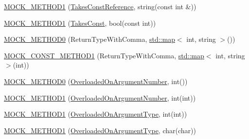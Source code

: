 \begin{DoxyCompactItemize}
\item 
\hyperlink{classtesting_1_1gmock__generated__function__mockers__test_1_1MockFoo_a605c84c3375d02769b0288d7637b552f}{M\+O\+C\+K\+\_\+\+M\+E\+T\+H\+O\+D1} (\hyperlink{classtesting_1_1gmock__generated__function__mockers__test_1_1FooInterface_a3db03c9698ecddfc62f2a1ed2f3c32c2}{Takes\+Const\+Reference}, string(const int \&))
\item 
\hyperlink{classtesting_1_1gmock__generated__function__mockers__test_1_1MockFoo_a7b548776b156454bcddecaca6294c52f}{M\+O\+C\+K\+\_\+\+M\+E\+T\+H\+O\+D1} (\hyperlink{classtesting_1_1gmock__generated__function__mockers__test_1_1FooInterface_a8c53e87edf0b9da878e5259f02b7f5dc}{Takes\+Const}, bool(const int))
\item 
\hyperlink{classtesting_1_1gmock__generated__function__mockers__test_1_1MockFoo_a5fb8c71ba44b97fbc8945905a9835215}{M\+O\+C\+K\+\_\+\+M\+E\+T\+H\+O\+D0} (Return\+Type\+With\+Comma, \hyperlink{app_2main_8cpp_a8f2b5a2f358cff079fbf01614064fbe5}{std\+::map}$<$ int, string $>$())
\item 
\hyperlink{classtesting_1_1gmock__generated__function__mockers__test_1_1MockFoo_a777b7b57ac125e2fe868e6cda46833fc}{M\+O\+C\+K\+\_\+\+C\+O\+N\+S\+T\+\_\+\+M\+E\+T\+H\+O\+D1} (Return\+Type\+With\+Comma, \hyperlink{app_2main_8cpp_a8f2b5a2f358cff079fbf01614064fbe5}{std\+::map}$<$ int, string $>$(int))
\item 
\hyperlink{classtesting_1_1gmock__generated__function__mockers__test_1_1MockFoo_a1666c565d1b48b351a1a453f6f87ff22}{M\+O\+C\+K\+\_\+\+M\+E\+T\+H\+O\+D0} (\hyperlink{classtesting_1_1gmock__generated__function__mockers__test_1_1FooInterface_ae9e86ac64fa9acedfb1fa747174c7f43}{Overloaded\+On\+Argument\+Number}, int())
\item 
\hyperlink{classtesting_1_1gmock__generated__function__mockers__test_1_1MockFoo_a45014dba5c27e9d59af3a94e0d324096}{M\+O\+C\+K\+\_\+\+M\+E\+T\+H\+O\+D1} (\hyperlink{classtesting_1_1gmock__generated__function__mockers__test_1_1FooInterface_ae9e86ac64fa9acedfb1fa747174c7f43}{Overloaded\+On\+Argument\+Number}, int(int))
\item 
\hyperlink{classtesting_1_1gmock__generated__function__mockers__test_1_1MockFoo_ad900c5945fc52a0a95ca1480207c7add}{M\+O\+C\+K\+\_\+\+M\+E\+T\+H\+O\+D1} (\hyperlink{classtesting_1_1gmock__generated__function__mockers__test_1_1FooInterface_ad9cc9a11570403fb8378ed6620892ec6}{Overloaded\+On\+Argument\+Type}, int(int))
\item 
\hyperlink{classtesting_1_1gmock__generated__function__mockers__test_1_1MockFoo_ab4b323a9c06a48c1116d55419195c1a6}{M\+O\+C\+K\+\_\+\+M\+E\+T\+H\+O\+D1} (\hyperlink{classtesting_1_1gmock__generated__function__mockers__test_1_1FooInterface_ad9cc9a11570403fb8378ed6620892ec6}{Overloaded\+On\+Argument\+Type}, char(char))

\end{DoxyCompactItemize}
